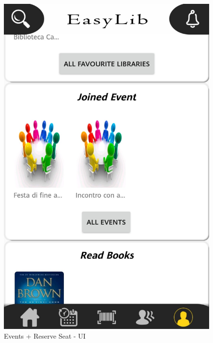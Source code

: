\begin{figure}[H]
	\includegraphics[scale=0.15]{Images/UI/Events/2}
	\caption{Events + Reserve Seat - UI}
\end{figure}


